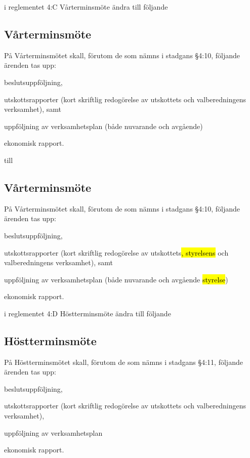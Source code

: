 \documentclass[../_main/handlingar.tex]{subfiles}
\begin{document}
\begin{attsatser}
\newpage

\att i reglementet 4:C Vårterminsmöte ändra till följande

\subsection{Vårterminsmöte}
På Vårterminsmötet skall, förutom de som nämns i stadgans §4:10,
följande ärenden tas upp:
\begin{alphlist}
    \item beslutsuppföljning,
    \item utskottsrapporter (kort skriftlig redogörelse av utskottets och valberedningens verksamhet), samt
    \item uppföljning av verksamhetsplan (både nuvarande och avgående)
    \item ekonomisk rapport.
\end{alphlist}

till 

\subsection{Vårterminsmöte}
På Vårterminsmötet skall, förutom de som nämns i stadgans §4:10,
följande ärenden tas upp:
\begin{alphlist}
    \item beslutsuppföljning,
    \item utskottsrapporter (kort skriftlig redogörelse av utskottets\hl{, styrelsens } och valberedningens verksamhet), samt
    \item uppföljning av verksamhetsplan (både nuvarande och avgående \hl{styrelse})
    \item ekonomisk rapport.
\end{alphlist}
\changenote

\newpage

\att i reglementet 4:D Höstterminsmöte ändra till följande

\subsection{Höstterminsmöte}
På Höstterminsmötet skall, förutom de som nämns i stadgans §4:11,
följande ärenden tas upp:
\begin{alphlist}
    \item beslutsuppföljning,
    \item utskottsrapporter (kort skriftlig redogörelse av utskottets och valberedningens verksamhet),
   	\item uppföljning av verksamhetsplan
    \item ekonomisk rapport.
\end{alphlist}


\end{attsatser}
\end{document}
